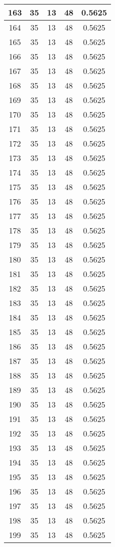 \documentclass[letterpaper, 12pt]{article}
\begin{document}
\begin{longtable}{|c|c|c|c|c|}
\hline
163 & 35 & 13 & 48 & 0.5625 \\
\hline
164 & 35 & 13 & 48 & 0.5625 \\
\hline
165 & 35 & 13 & 48 & 0.5625 \\
\hline
166 & 35 & 13 & 48 & 0.5625 \\
\hline
167 & 35 & 13 & 48 & 0.5625 \\
\hline
168 & 35 & 13 & 48 & 0.5625 \\
\hline
169 & 35 & 13 & 48 & 0.5625 \\
\hline
170 & 35 & 13 & 48 & 0.5625 \\
\hline
171 & 35 & 13 & 48 & 0.5625 \\
\hline
172 & 35 & 13 & 48 & 0.5625 \\
\hline
173 & 35 & 13 & 48 & 0.5625 \\
\hline
174 & 35 & 13 & 48 & 0.5625 \\
\hline
175 & 35 & 13 & 48 & 0.5625 \\
\hline
176 & 35 & 13 & 48 & 0.5625 \\
\hline
177 & 35 & 13 & 48 & 0.5625 \\
\hline
178 & 35 & 13 & 48 & 0.5625 \\
\hline
179 & 35 & 13 & 48 & 0.5625 \\
\hline
180 & 35 & 13 & 48 & 0.5625 \\
\hline
181 & 35 & 13 & 48 & 0.5625 \\
\hline
182 & 35 & 13 & 48 & 0.5625 \\
\hline
183 & 35 & 13 & 48 & 0.5625 \\
\hline
184 & 35 & 13 & 48 & 0.5625 \\
\hline
185 & 35 & 13 & 48 & 0.5625 \\
\hline
186 & 35 & 13 & 48 & 0.5625 \\
\hline
187 & 35 & 13 & 48 & 0.5625 \\
\hline
188 & 35 & 13 & 48 & 0.5625 \\
\hline
189 & 35 & 13 & 48 & 0.5625 \\
\hline
190 & 35 & 13 & 48 & 0.5625 \\
\hline
191 & 35 & 13 & 48 & 0.5625 \\
\hline
192 & 35 & 13 & 48 & 0.5625 \\
\hline
193 & 35 & 13 & 48 & 0.5625 \\
\hline
194 & 35 & 13 & 48 & 0.5625 \\
\hline
195 & 35 & 13 & 48 & 0.5625 \\
\hline
196 & 35 & 13 & 48 & 0.5625 \\
\hline
197 & 35 & 13 & 48 & 0.5625 \\
\hline
198 & 35 & 13 & 48 & 0.5625 \\
\hline
199 & 35 & 13 & 48 & 0.5625 \\
\hline
\end{longtable}
\end{document}
